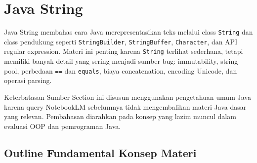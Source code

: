 \section{Java String}

Java String membahas cara Java merepresentasikan teks melalui class \texttt{String} dan class pendukung seperti \texttt{StringBuilder}, \texttt{StringBuffer}, \texttt{Character}, dan API regular expression. Materi ini penting karena \texttt{String} terlihat sederhana, tetapi memiliki banyak detail yang sering menjadi sumber bug: immutability, string pool, perbedaan \texttt{==} dan \texttt{equals}, biaya concatenation, encoding Unicode, dan operasi parsing.

\begin{cmt}{Keterbatasan Sumber}{}
Section ini disusun menggunakan pengetahuan umum Java karena query NotebookLM sebelumnya tidak mengembalikan materi Java dasar yang relevan. Pembahasan diarahkan pada konsep yang lazim muncul dalam evaluasi OOP dan pemrograman Java.
\end{cmt}

\subsection{Outline Fundamental Konsep Materi}

